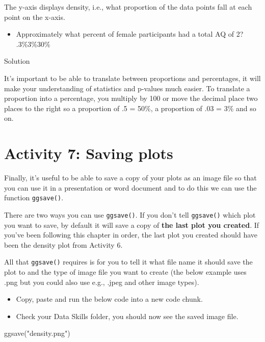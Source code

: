 \documentclass[
  oneside]{book}
\newenvironment{Shaded}{\begin{snugshade}}{\end{snugshade}}
\newcommand{\FunctionTok}[1]{\textcolor[rgb]{0.00,0.00,0.00}{#1}}
\newcommand{\NormalTok}[1]{#1}
\newcommand{\StringTok}[1]{\textcolor[rgb]{0.31,0.60,0.02}{#1}}
\providecommand{\tightlist}{%
  \setlength{\itemsep}{0pt}\setlength{\parskip}{0pt}}
\begin{document}
The y-axis displays density, i.e., what proportion of the data points fall at each point on the x-axis.

\begin{itemize}
\tightlist
\item
  Approximately what percent of female participants had a total AQ of 2? .3\%3\%30\%
\end{itemize}

Solution

It's important to be able to translate between proportions and percentages, it will make your understanding of statistics and p-values much easier. To translate a proportion into a percentage, you multiply by 100 or move the decimal place two places to the right so a proportion of .5 = 50\%, a proportion of .03 = 3\% and so on.

\hypertarget{activity-7-saving-plots}{%
\section{Activity 7: Saving plots}\label{activity-7-saving-plots}}

Finally, it's useful to be able to save a copy of your plots as an image file so that you can use it in a presentation or word document and to do this we can use the function \texttt{ggsave()}.

There are two ways you can use \texttt{ggsave()}. If you don't tell \texttt{ggsave()} which plot you want to save, by default it will save a copy of \textbf{the last plot you created}. If you've been following this chapter in order, the last plot you created should have been the density plot from Activity 6.

All that \texttt{ggsave()} requires is for you to tell it what file name it should save the plot to and the type of image file you want to create (the below example uses .png but you could also use e.g., .jpeg and other image types).

\begin{itemize}
\tightlist
\item
  Copy, paste and run the below code into a new code chunk.
\item
  Check your Data Skills folder, you should now see the saved image file.
\end{itemize}

\begin{Shaded}
\begin{Highlighting}[]
\FunctionTok{ggsave}\NormalTok{(}\StringTok{"density.png"}\NormalTok{)}
\end{Highlighting}
\end{Shaded}
\end{document}
